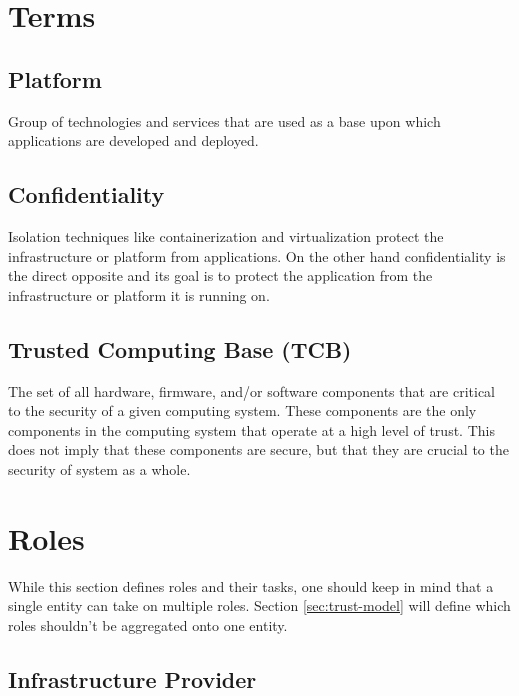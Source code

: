 \section{Terms}

\subsection{Platform}

Group of technologies and services that are used as a base upon which
applications are developed and deployed.


\subsection{Confidentiality}
\label{sec:confidentiality}

Isolation techniques like containerization and virtualization protect the
infrastructure or platform from applications. On the other hand confidentiality
is the direct opposite and its goal is to protect the application from the
infrastructure or platform it is running on.

\subsection{Trusted Computing Base (TCB)}

The set of all hardware, firmware, and/or software components that are critical
to the security of a given computing system. These components are the only
components in the computing system that operate at a high level of trust. This
does not imply that these components are secure, but that they are crucial to the
security of system as a whole.

\section{Roles}

While this section defines roles and their tasks, one should keep in mind that a
single entity can take on multiple roles. Section \ref{sec:trust-model} will
define which roles shouldn't be aggregated onto one entity.


\subsection*{Infrastructure Provider}

